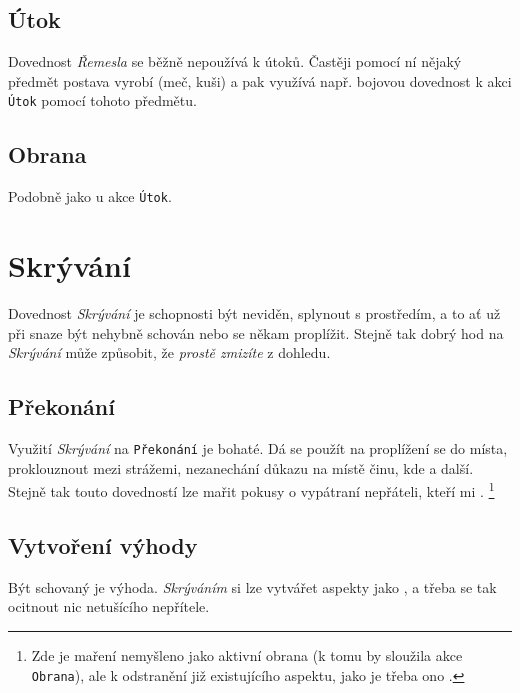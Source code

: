 \documentclass[../main.tex]{subfiles}
\begin{document}
\subsection*{Útok}
\label{subsec:remesla-utok}
\utok

Dovednost \textit{Řemesla} se běžně nepoužívá k útoků. Častěji pomocí ní nějaký předmět postava vyrobí (meč, kuši) a pak využívá např. bojovou dovednost k akci \texttt{Útok} pomocí tohoto předmětu.

\subsection*{Obrana}
\label{subsec:remesla-obrana}
\obrana

Podobně jako u akce \texttt{Útok}.

\section{Skrývání}
\label{sec:skryvani}

Dovednost \textit{Skrývání} je schopnosti být neviděn, splynout s prostředím, a to ať už při snaze být nehybně schován nebo se někam proplížit. Stejně tak dobrý hod na \textit{Skrývání} může způsobit, že \textit{prostě zmizíte} z dohledu.

\subsection*{Překonání}
\label{subsec:skryvani-prekonani}
\prekonani

Využití \textit{Skrývání} na \texttt{Překonání} je bohaté. Dá se použít na proplížení se do  místa, proklouznout mezi strážemi, nezanechání důkazu na místě činu, kde  a další. Stejně tak touto dovedností lze mařit pokusy o vypátraní nepřáteli, kteří mi . \footnote{Zde je maření nemyšleno jako aktivní obrana (k tomu by sloužila akce \texttt{Obrana}), ale k odstranění již existujícího aspektu, jako je třeba ono .}

\subsection*{Vytvoření výhody}
\label{subsec:skryvani-vytvoreni}
\vytvoreni

Být schovaný je výhoda. \textit{Skrýváním} si lze vytvářet aspekty jako ,  a třeba se tak ocitnout  nic netušícího nepřítele. 
\end{document}
